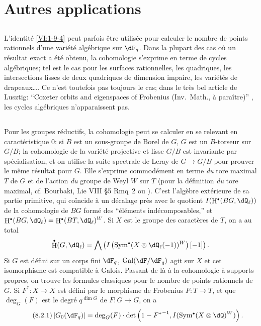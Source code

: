 \documentclass[oneside]{book}
\DeclareMathOperator{\gal}{Gal}
\DeclareMathOperator{\h}{H}
\theoremstyle{sga-source}
\theoremstyle{sga-source-dash}
\theoremstyle{sga-source-dotdash}
\theoremstyle{sga-source-number-note-dash}
\theoremstyle{sga-source-note-number-dotdash}
\theoremstyle{sga-source-example-dotdash}
\theoremstyle{sga-source-inline-number}
\theoremstyle{sga-source-bare-number}
\theoremstyle{sga-source}
\let\oldbullet\bullet
\renewcommand{\bullet}{\textnormal{\tiny$\oldbullet$}}
\newcommand{\PrintPage}[1]{}\newcommand{\MathPage}[1]{}\newcommand{\PrintCite}[2]{#1}\newcommand{\var}[3]{#2}
\begin{document}
\PrintPage{230}
\section{Autres applications}\label{VI:8}





\subsection{}\label{VI:8-1}

L'identité \ref{VI:1-9-4} peut parfois être utilisée pour calculer 
le nombre de points rationnels d'une variété algébrique sur $\dF_q$. Dans 
la plupart des cas où un résultat exact a été obtenu, la cohomologie 
s'exprime en terme de cycles algébriques; tel est le cas pour les surfaces 
rationnelles, les quadriques, les intersections lisses de deux quadriques de 
dimension impaire, les variétés de drapeaux\ldots. Ce n'est toutefois pas 
toujours le cas; dans le très bel article de Lusztig: ``Coxeter orbits and eigenspaces of Frobenius (Inv.~Math., à paraître)'' \cite{lu76}, les cycles 
algébriques n'apparaissent pas. 





\subsection{}\label{VI:8-2}

Pour les groupes réductifs, la cohomologie peut se calculer en se relevant en 
caractéristique $0$: si $B$ est un sous-groupe de Borel de $G$, $G$ est un 
$B$-torseur sur $G/B$; la cohomologie de la variété projective et lisse 
$G/B$ est invariante par spécialisation, et on utilise la suite spectrale de 
Leray de $G\to G/B$ pour prouver le même résultat pour $G$. Elle s'exprime 
commodément en terme \emph{du} tore maximal $T$ de $G$ et de l'action 
\emph{du} \var{groupe de Weil $W$}{groupe de Weyl $W$}{S45-SOL-0978} sur $T$ (pour la définition \emph{du} tore 
maximal, cf. Bourbaki, Lie VIII \S 5 Rmq~2 \cite[VIII \S 5 Rem.2]{bo05} ou \cite[p.105]{dl76}). C'est 
l'algèbre extérieure de sa partie primitive, qui coïncide à un décalage 
près avec le quotient $I(\h^\bullet(B G,\dQ_\ell))$ de la cohomologie de 
$B G$ formé des ``éléments indécomposables,'' et 
$\h^\bullet(B G,\dQ_\ell)=\h^\bullet(B T,\dQ_\ell)^W$. Si $X$ est le groupe des 
caractères de $T$, on a au total 
\[
  \h^\bullet(G,\dQ_\ell) = \bigwedge \left(I\left(\operatorname{Sym}^\bullet(X\otimes \dQ_\ell(-1))^W\right)[-1]\right) \text{.}
\]
Si $G$ est défini sur un corps fini $\dF_q$, $\gal(\dF/\dF_q)$ agit sur $X$ 
et cet isomorphisme est compatible à Galois. Passant de là à la 
cohomologie à supports propres, on trouve les formules classiques pour le 
nombre de points rationnels de $G$. Si $F^\ast:X\to X$ est défini par le 
morphisme de Frobenius $F:T\to T$, et que $\deg_G(F)$ est le degré 
$q^{\dim G}$ de $F:G\to G$, on a 
\begin{equation*}\tag{8.2.1}\label{VI:eq:8-2-1}
  \left|G_0(\dF_q)\right| = \deg_G(F) \cdot \det\left(1-{F^\ast}^{-1},I(\operatorname{Sym}^\bullet(X\otimes \dQ)^W)\right) \text{.}
\end{equation*}
\end{document}
